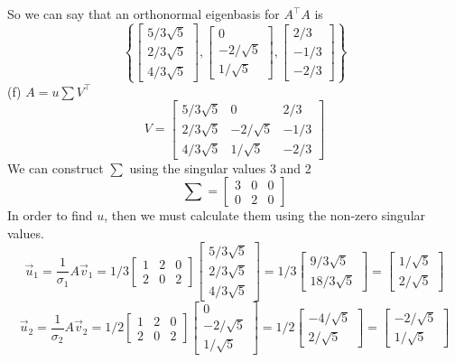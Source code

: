 \documentclass{report}
\begin{document}
So we can say that an orthonormal eigenbasis for $A^\top A$ is
$$
\left\{
\begin{bmatrix}5/3\sqrt{5}\\2/3\sqrt{5}\\4/3\sqrt{5}\end{bmatrix},
\begin{bmatrix}0\\-2/\sqrt{5}\\1/\sqrt{5}\end{bmatrix},
\begin{bmatrix}2/3\\-1/3\\-2/3\end{bmatrix}
\right\}
$$
(f) $A = u\sum V^\top$
$$
V = \begin{bmatrix}5/3\sqrt{5}&0&2/3\\
2/3\sqrt{5}&-2/\sqrt{5}&-1/3\\
4/3\sqrt{5}&1/\sqrt{5}&-2/3
\end{bmatrix}
$$
We can construct $\sum$ using the singular values 3 and 2
$$
\sum = \begin{bmatrix}3&0&0\\0&2&0\end{bmatrix}
$$
In order to find $u$, then we must calculate them using the non-zero singular values.
$$
\vec{u}_1 = \frac{1}{\sigma_1}A\vec{v}_1 = 1/3\begin{bmatrix}1&2&0\\2&0&2\end{bmatrix}\begin{bmatrix}5/3\sqrt{5}\\2/3\sqrt{5}\\4/3\sqrt{5}\end{bmatrix} = 1/3\begin{bmatrix}9/3\sqrt{5}\\18/3\sqrt{5}\end{bmatrix} = \begin{bmatrix}1/\sqrt{5}\\2/\sqrt{5}\end{bmatrix}
$$
$$
\vec{u}_2 = \frac{1}{\sigma_2}A\vec{v}_2 = 1/2\begin{bmatrix}1&2&0\\2&0&2\end{bmatrix}\begin{bmatrix}0\\-2/\sqrt{5}\\1/\sqrt{5}\end{bmatrix} = 1/2\begin{bmatrix}-4/\sqrt{5}\\2/\sqrt{5}\end{bmatrix} = \begin{bmatrix}-2/\sqrt{5}\\1/\sqrt{5}\end{bmatrix}
$$
\end{document}
